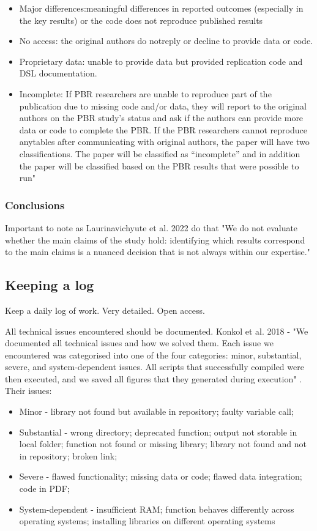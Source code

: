 \begin{itemize}
\begin{itemize}
        \item  Major differences:meaningful differences in reported outcomes (especially in the key results) or the code does not reproduce published results
        \item No access: the original authors do notreply or decline to provide data or code.
        \item Proprietary data: unable to provide data but provided replication code and DSL documentation.
        \item Incomplete: If PBR researchers are unable to reproduce part of the publication due to missing code and/or data, they will report to the original authors on the PBR study’s status and ask if the authors can provide more data or code to complete the PBR. If the PBR researchers cannot reproduce anytables after communicating with original authors, the paper will have two classifications. The paper will be classified as “incomplete” and in addition the paper will be classified based on the PBR results that were possible to run"
    \end{itemize}
\end{itemize}

\subsubsection{Conclusions}

Important to note as Laurinavichyute et al. 2022 do that "We do not evaluate whether the main claims of the study hold: identifying which results correspond to the main claims is a nuanced decision that is not always within our expertise."

\subsection{Keeping a log}

Keep a daily log of work. Very detailed. Open access.

All technical issues encountered should be documented. Konkol et al. 2018 - "We documented all technical issues and how we solved them. Each issue we encountered was categorised into one of the four categories: minor, substantial, severe, and system-dependent issues. All scripts that successfully compiled were then executed, and we saved all figures that they generated during execution" . Their issues:
\begin{itemize}
    \item Minor - library not found but available in repository; faulty variable call;
    \item Substantial - wrong directory; deprecated function; output not storable in local folder; function not found or missing library; library not found and not in repository; broken link;
    \item Severe - flawed functionality; missing data or code; flawed data integration; code in PDF;
    \item System-dependent - insufficient RAM; function behaves differently across operating systems; installing libraries on different operating systems\autocite{konkol_computational_2019}
\end{itemize}

